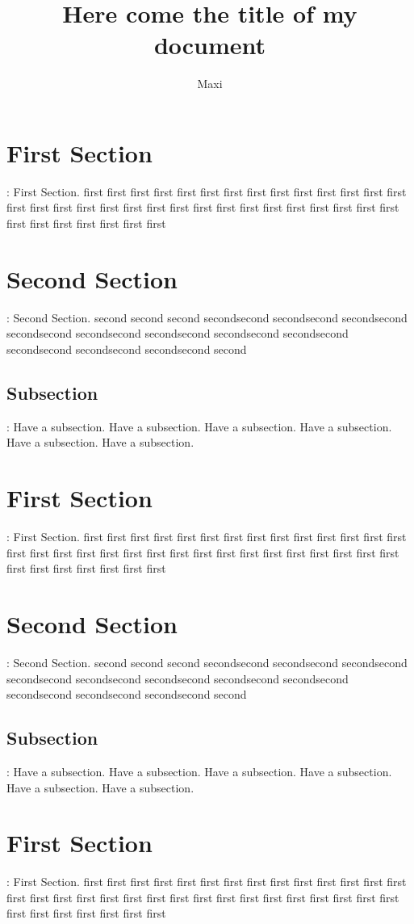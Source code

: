 \documentclass[a4paper,12pt]{article}
\title{Here come the title of my document}
\author{Maxi}
\date{}
\begin{document}
	\maketitle
	\section*{First Section}:
	First Section. first first first first first first first first first first first first first first first first first first first first first first first first first first first first first first first first first first first first first first 
	
	\section{Second Section}:
	Second Section. second second second secondsecond secondsecond secondsecond secondsecond secondsecond secondsecond secondsecond secondsecond secondsecond secondsecond secondsecond second
		\subsection{Subsection}:
		Have a subsection.	Have a subsection.	Have a subsection.	Have a subsection.	Have a subsection.	Have a subsection.
		
	\section{First Section}:
	First Section. first first first first first first first first first first first first first first first first first first first first first first first first first first first first first first first first first first first first first first 
	
	\section{Second Section}:
	Second Section. second second second secondsecond secondsecond secondsecond secondsecond secondsecond secondsecond secondsecond secondsecond secondsecond secondsecond secondsecond second
	\subsection{Subsection}:
	Have a subsection.	Have a subsection.	Have a subsection.	Have a subsection.	Have a subsection.	Have a subsection.
	
		\section*{First Section}:
	First Section. first first first first first first first first first first first first first first first first first first first first first first first first first first first first first first first first first first first first first first 
	
\end{document}
